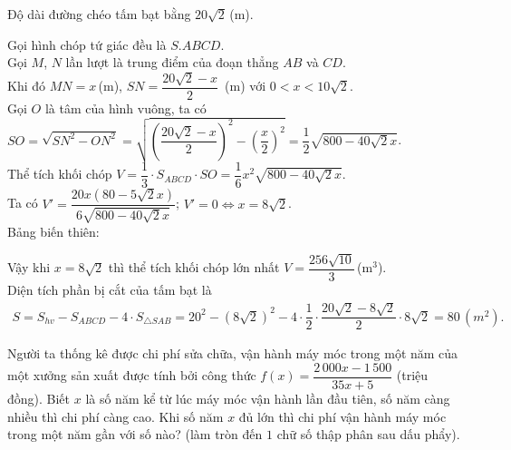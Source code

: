\begin{ex}
{Độ dài đường chéo tấm bạt bằng $20 \sqrt{2}$\,(m).

Gọi hình chóp tứ giác đều là $S.ABCD$.\\
Gọi $M$, $N$ lần lượt là trung điểm của đoạn thẳng $AB$ và $CD$.\\
Khi đó $MN=x$\,(m), $SN=\dfrac{20 \sqrt{2}-x}{2}$\, (m) với $0<x<10 \sqrt{2}$.\\
Gọi $O$ là tâm của hình vuông, ta có\\
$SO=\sqrt{SN^2-ON^2}=\sqrt{\left(\dfrac{20 \sqrt{2}-x}{2}\right)^2-\left(\dfrac{x}{2}\right)^2}=\dfrac{1}{2} \sqrt{800-40 \sqrt{2}x}$.\\
Thể tích khối chóp $V=\dfrac{1}{3}\cdot S_{ABCD} \cdot SO=\dfrac{1}{6} x^2 \sqrt{800-40 \sqrt{2} x}$.\\
Ta có $V'=\dfrac{20 x(80-5 \sqrt{2} x)}{6 \sqrt{800-40 \sqrt{2} x}}$; $V'=0 \Leftrightarrow x=8 \sqrt{2}$.\\
Bảng biến thiên:
\begin{center}
\end{center}
Vậy khi $x=8 \sqrt{2}$ thì thể tích khối chóp lớn nhất $V=\dfrac{256 \sqrt{10}}{3}$\,(m$^3$).\\
Diện tích phần bị cắt của tấm bạt là
\begin{eqnarray*}
S=S_{hv}-S_{ABCD}-4 \cdot S_{\triangle {SAB}}=20^2-(8 \sqrt{2})^2-4 \cdot \dfrac{1}{2} \cdot \dfrac{20 \sqrt{2}-8 \sqrt{2}}{2} \cdot 8 \sqrt{2}=80\,(m^2).
\end{eqnarray*}
}
\end{ex}

\begin{ex}%
	Người ta thống kê được chi phí sửa chữa, vận hành máy móc trong một năm của một xưởng sản xuất được tính bởi công thức $f\left( x \right)=\dfrac{2\,000x-1\,500}{35x+5}$ (triệu đồng). Biết $x$ là số năm kể từ lúc máy móc vận hành lần đầu tiên, số năm càng nhiều thì chi phí càng cao. Khi số năm $x$ đủ lớn thì chi phí vận hành máy móc trong một năm gần với số nào? (làm tròn đến $1$ chữ số thập phân sau dấu phẩy).\\
\end{ex}

